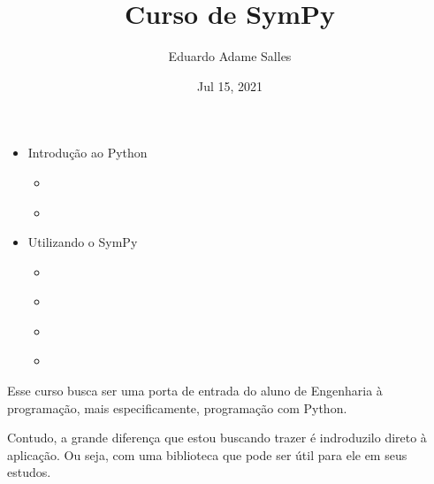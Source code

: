 \documentclass[letterpaper,10pt,english]{jupyterBook}
\title{Curso de SymPy}
\date{Jul 15, 2021}
\author{Eduardo Adame Salles}
\begin{document}
\pagestyle{empty}
\sphinxmaketitle
\pagestyle{plain}
\sphinxtableofcontents
\pagestyle{normal}
\label{\detokenize{intro::doc}}

\begin{itemize}
\item {} 
\sphinxAtStartPar
Introdução ao Python

\begin{itemize}
\item {} 
\sphinxAtStartPar
{\hyperref[\detokenize{chapters/1::doc}]{}}

\item {} 
\sphinxAtStartPar
{\hyperref[\detokenize{chapters/2::doc}]{}}

\end{itemize}
\end{itemize}
\begin{itemize}
\item {} 
\sphinxAtStartPar
Utilizando o SymPy

\begin{itemize}
\item {} 
\sphinxAtStartPar
{\hyperref[\detokenize{chapters/3::doc}]{}}

\item {} 
\sphinxAtStartPar
{\hyperref[\detokenize{chapters/4::doc}]{}}

\item {} 
\sphinxAtStartPar
{\hyperref[\detokenize{chapters/5::doc}]{}}

\item {} 
\sphinxAtStartPar
{\hyperref[\detokenize{chapters/6::doc}]{}}

\end{itemize}
\end{itemize}

\begin{DUlineblock}{0em}
\item[] 
\end{DUlineblock}

\sphinxAtStartPar
Esse curso busca ser uma porta de entrada do aluno de Engenharia à programação, mais especificamente, programação com Python.

\sphinxAtStartPar
Contudo, a grande diferença que estou buscando trazer é indroduzi\sphinxhyphen{}lo direto à aplicação. Ou seja, com uma biblioteca que pode ser útil para ele em seus estudos.
\end{document}
